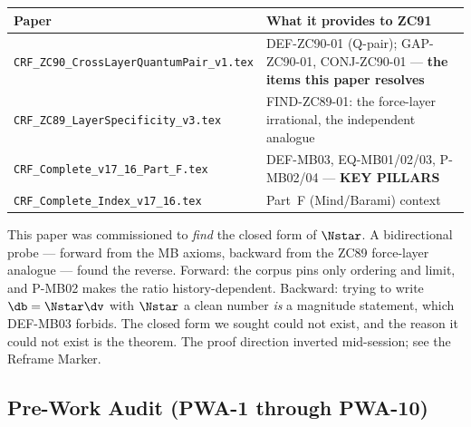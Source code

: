 \documentclass[12pt, a4paper]{article}
\begin{document}
\begin{keybox}[title={Companion Papers --- ZC91}]
{\footnotesize\renewcommand{\arraystretch}{1.3}
\begin{center}
\begin{tabular}{@{}p{6.1cm}p{6.4cm}@{}}
\toprule
\textbf{Paper} & \textbf{What it provides to ZC91} \\
\midrule
\texttt{CRF\_ZC90\_CrossLayerQuantumPair\_v1.tex}
  & DEF-ZC90-01 (Q-pair); GAP-ZC90-01, CONJ-ZC90-01 ---
    \textbf{the items this paper resolves} \\
\texttt{CRF\_ZC89\_LayerSpecificity\_v3.tex}
  & FIND-ZC89-01: the force-layer irrational, the independent analogue \\
\texttt{CRF\_Complete\_v17\_16\_Part\_F.tex}
  & DEF-MB03, EQ-MB01/02/03, P-MB02/04 --- \textbf{KEY PILLARS} \\
\texttt{CRF\_Complete\_Index\_v17\_16.tex}
  & Part~F (Mind/Barami) context \\
\bottomrule
\end{tabular}
\end{center}}
\end{keybox}

\begin{derivedbox}[title={Discovery Note}]
This paper was commissioned to \emph{find} the closed form of $\Nstar$. A
bidirectional probe --- forward from the MB axioms, backward from the
ZC89 force-layer analogue --- found the reverse. Forward: the corpus
pins only ordering and limit, and P-MB02 makes the ratio
history-dependent. Backward: trying to write $\db=\Nstar\dv$ with
$\Nstar$ a clean number \emph{is} a magnitude statement, which DEF-MB03
forbids. The closed form we sought could not exist, and the reason it
could not exist is the theorem. The proof direction inverted mid-session;
see the Reframe Marker.
\end{derivedbox}

\subsection{Pre-Work Audit (PWA-1 through PWA-10)}
\end{document}
